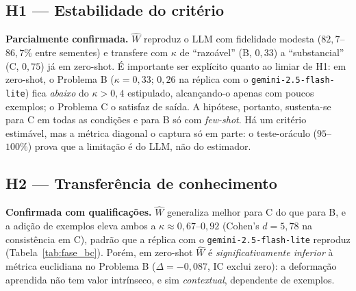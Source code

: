 \documentclass[12pt,a4paper]{article}
\newcommand{\West}{\ensuremath{\hat{W}}}   %
\begin{document}
\subsection{H1 — Estabilidade do critério}
\textbf{Parcialmente confirmada.} \West{} reproduz o LLM com fidelidade modesta
($82{,}7$–$86{,}7\%$ entre sementes) e transfere com $\kappa$ de ``razoável'' (B, $0{,}33$) a
``substancial'' (C, $0{,}75$) já em zero-shot. É importante ser explícito quanto ao limiar de
H1: em zero-shot, o Problema B ($\kappa = 0{,}33$; $0{,}26$ na réplica com o
\texttt{gemini-2.5-flash-lite}) fica \emph{abaixo} do $\kappa > 0{,}4$
estipulado, alcançando-o apenas com poucos exemplos; o Problema C o satisfaz de saída. A
hipótese, portanto, sustenta-se para C em todas as condições e para B só com \emph{few-shot}.
Há um critério estimável, mas a métrica diagonal o captura só em parte: o teste-oráculo
($95$–$100\%$) prova que a limitação é do LLM, não do estimador.

\subsection{H2 — Transferência de conhecimento}
\textbf{Confirmada com qualificações.} \West{} generaliza melhor para C do que para B, e a
adição de exemplos eleva ambos a $\kappa \approx 0{,}67$–$0{,}92$ (Cohen's $d = 5{,}78$ na
consistência em C), padrão que a réplica com o \texttt{gemini-2.5-flash-lite} reproduz
(Tabela~\ref{tab:fase_bc}). Porém, em zero-shot \West{} é \emph{significativamente inferior} à
métrica euclidiana no Problema B ($\Delta = -0{,}087$, IC exclui zero): a deformação
aprendida não tem valor intrínseco, e sim \emph{contextual}, dependente de exemplos.
\end{document}
